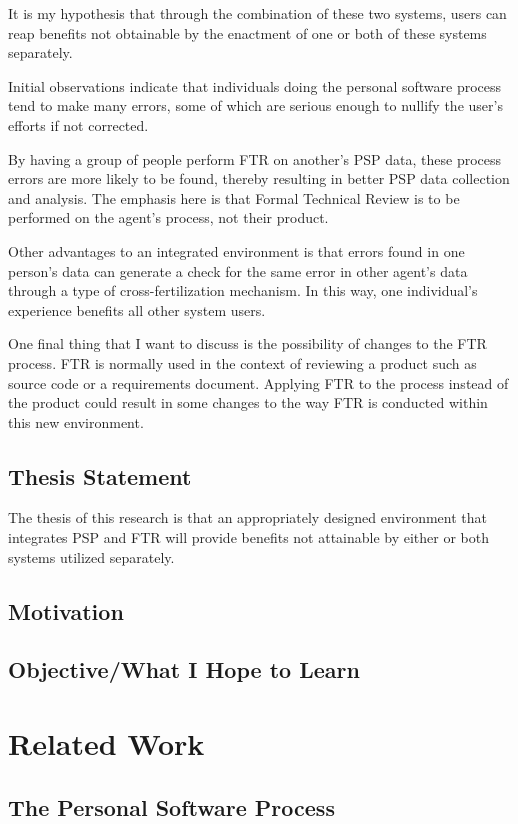 It is my hypothesis that through the combination of these two systems,
users can reap benefits not obtainable by the enactment of one or both of
these systems separately.

Initial observations indicate that individuals doing the personal software
process tend to make many errors, some of which are serious enough to
nullify the user's efforts if not corrected.

By having a group of people perform FTR on another's PSP data, these
process errors are more likely to be found, thereby resulting in better PSP
data collection and analysis.  The emphasis here is that Formal Technical
Review is to be performed on the agent's process, not their product.

Other advantages to an integrated environment is that errors found in one
person's data can generate a check for the same error in other agent's data
through a type of cross-fertilization mechanism.  In this way, one
individual's experience benefits all other system users.

One final thing that I want to discuss is the possibility of changes to the
FTR process.  FTR is normally used in the context of reviewing a product
such as source code or a requirements document.  Applying FTR to the
process instead of the product could result in some changes to the way FTR
is conducted within this new environment.
\section{Thesis Statement} 
The thesis of this research is that an appropriately designed environment
that integrates PSP and FTR will provide benefits not attainable by either
or both systems utilized separately.
\section{Motivation}
\section{Objective/What I Hope to Learn}

\chapter{Related Work}
\section{The Personal Software Process}
